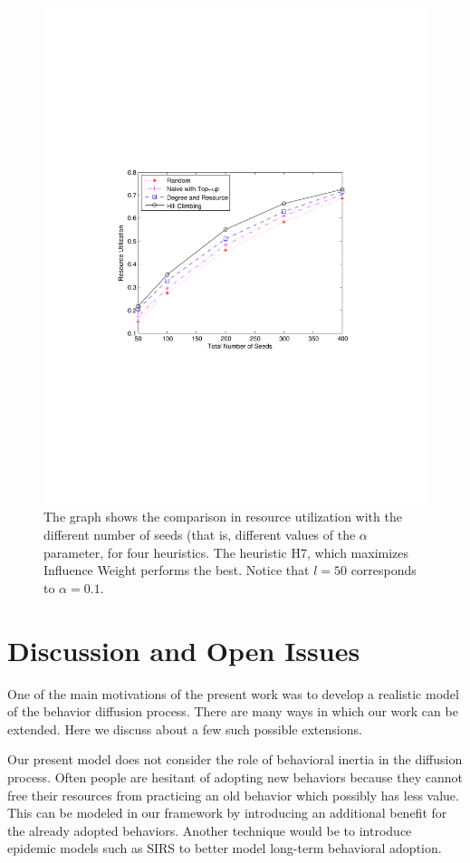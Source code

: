 \documentclass[letterpaper]{article}
\theoremstyle{plain} 		\newtheorem{thm}{Theorem}[section]
\theoremstyle{definition} 	\newtheorem{defn}[thm]{Definition}
\theoremstyle{remark}		\newtheorem{rem}{Remark}
\begin{document}
\begin{figure}[htb]
\includegraphics[viewport=1.5in 3.5in 6.75in 7.5in, width=\columnwidth]{comp}
\caption{The graph shows the comparison in resource utilization with the different number of seeds (that is, different values of the $\alpha$ parameter, for four heuristics. The heuristic H7, which maximizes Influence Weight  performs the best. Notice that $l=50$ corresponds to $\alpha=0.1$.}\label{fig:comparison}
\end{figure}

\section{Discussion and Open Issues}\label{sec:disc}
One of the main motivations of the present work was to develop a realistic model of the behavior diffusion process. There are many ways in which our work can be extended. Here we discuss about a few such possible extensions.

Our present model does not consider the role of behavioral inertia in the diffusion process. Often people are hesitant of adopting new behaviors because they cannot free their resources from practicing an old behavior which possibly has less value. This can be modeled in our framework by introducing an additional benefit for the already adopted behaviors. Another technique would be to introduce epidemic models such as SIRS to better model long-term behavioral adoption. 
\end{document}
